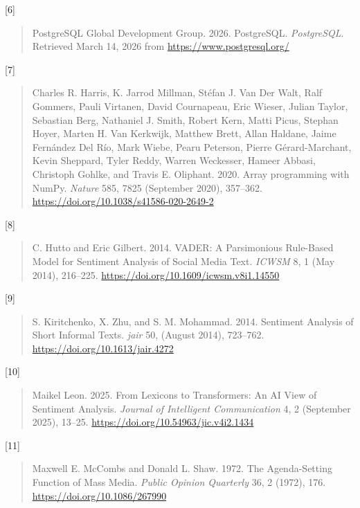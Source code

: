 {[}6{]}

\begin{quote}
PostgreSQL Global Development Group. 2026. PostgreSQL. \emph{PostgreSQL}. Retrieved March 14, 2026 from \url{https://www.postgresql.org/}
\end{quote}

{[}7{]}

\begin{quote}
Charles R. Harris, K. Jarrod Millman, Stéfan J. Van Der Walt, Ralf Gommers, Pauli Virtanen, David Cournapeau, Eric Wieser, Julian Taylor, Sebastian Berg, Nathaniel J. Smith, Robert Kern, Matti Picus, Stephan Hoyer, Marten H. Van Kerkwijk, Matthew Brett, Allan Haldane, Jaime Fernández Del Río, Mark Wiebe, Pearu Peterson, Pierre Gérard-Marchant, Kevin Sheppard, Tyler Reddy, Warren Weckesser, Hameer Abbasi, Christoph Gohlke, and Travis E. Oliphant. 2020. Array programming with NumPy. \emph{Nature} 585, 7825 (September 2020), 357--362. \url{https://doi.org/10.1038/s41586-020-2649-2}
\end{quote}

{[}8{]}

\begin{quote}
C. Hutto and Eric Gilbert. 2014. VADER: A Parsimonious Rule-Based Model for Sentiment Analysis of Social Media Text. \emph{ICWSM} 8, 1 (May 2014), 216--225. \url{https://doi.org/10.1609/icwsm.v8i1.14550}
\end{quote}

{[}9{]}

\begin{quote}
S. Kiritchenko, X. Zhu, and S. M. Mohammad. 2014. Sentiment Analysis of Short Informal Texts. \emph{jair} 50, (August 2014), 723--762. \url{https://doi.org/10.1613/jair.4272}
\end{quote}

{[}10{]}

\begin{quote}
Maikel Leon. 2025. From Lexicons to Transformers: An AI View of Sentiment Analysis. \emph{Journal of Intelligent Communication} 4, 2 (September 2025), 13--25. \url{https://doi.org/10.54963/jic.v4i2.1434}
\end{quote}

{[}11{]}

\begin{quote}
Maxwell E. McCombs and Donald L. Shaw. 1972. The Agenda-Setting Function of Mass Media. \emph{Public Opinion Quarterly} 36, 2 (1972), 176. \url{https://doi.org/10.1086/267990}
\end{quote}

